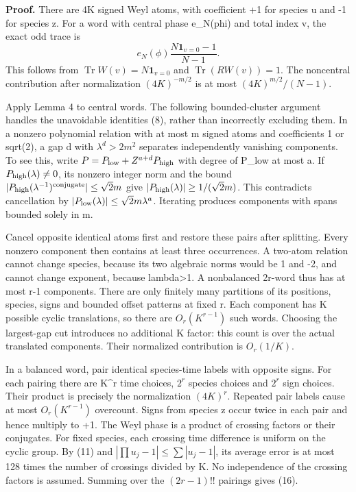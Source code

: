 \documentclass[11pt,a4paper]{article}
\begin{document}
\textbf{Proof.} There are 4K signed Weyl atoms, with coefficient +1 for species u and -1 for species z. For a word with central phase e\_N(phi) and total index v, the exact odd trace is \[
 e_N(\phi)\frac{N\mathbf1_{v=0}-1}{N-1}.                       \tag{17}
\] This follows from \(\operatorname{Tr}W(v)=N\mathbf1_{v=0}\) and \(\operatorname{Tr}(RW(v))=1\). The noncentral contribution after normalization \((4K)^{-m/2}\) is at most \((4K)^{m/2}/(N-1)\).

Apply Lemma 4 to central words. The following bounded-cluster argument handles the unavoidable identities (8), rather than incorrectly excluding them. In a nonzero polynomial relation with at most m signed atoms and coefficients 1 or sqrt(2), a gap d with \(\lambda^d>2m^2\) separates independently vanishing components. To see this, write \(P=P_{\rm low}+Z^{a+d}P_{\rm high}\) with degree of P\_low at most a. If \(P_{\rm high}(\lambda)\ne0\), its nonzero integer norm and the bound \(|P_{\rm high}(\lambda^{-1})^{\rm conjugate}|\leq\sqrt2m\) give \(|P_{\rm high}(\lambda)|\geq1/(\sqrt2m)\). This contradicts cancellation by \(|P_{\rm low}(\lambda)|\leq\sqrt2m\lambda^a\). Iterating produces components with spans bounded solely in m.

Cancel opposite identical atoms first and restore these pairs after splitting. Every nonzero component then contains at least three occurrences. A two-atom relation cannot change species, because its two algebraic norms would be 1 and -2, and cannot change exponent, because lambda\textgreater1. A nonbalanced 2r-word thus has at most r-1 components. There are only finitely many partitions of its positions, species, signs and bounded offset patterns at fixed r. Each component has K possible cyclic translations, so there are \(O_r(K^{r-1})\) such words. Choosing the largest-gap cut introduces no additional K factor: this count is over the actual translated components. Their normalized contribution is \(O_r(1/K)\).

In a balanced word, pair identical species-time labels with opposite signs. For each pairing there are K\^{}r time choices, \(2^r\) species choices and \(2^r\) sign choices. Their product is precisely the normalization \((4K)^r\). Repeated pair labels cause at most \(O_r(K^{r-1})\) overcount. Signs from species z occur twice in each pair and hence multiply to +1. The Weyl phase is a product of crossing factors or their conjugates. For fixed species, each crossing time difference is uniform on the cyclic group. By (11) and \(|\prod u_j-1|\leq\sum|u_j-1|\), its average error is at most 128 times the number of crossings divided by K. No independence of the crossing factors is assumed. Summing over the \((2r-1)!!\) pairings gives (16).
\end{document}
